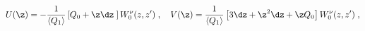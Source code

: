 \begin{equation}
U(\z)=-{{1}\over{\langle Q_1\rangle}} \left[Q_{0}+\z\dz\;\right]{
W^{\nu}_{0}(z,z')} \;,\quad V(\z)={{1}\over{\langle
Q_1\rangle}}\left[3\dz+\z^2\dz+\z Q_{0}\right]
W^{\nu}_{0}(z,z')\;,\nonumber
\end{equation}

